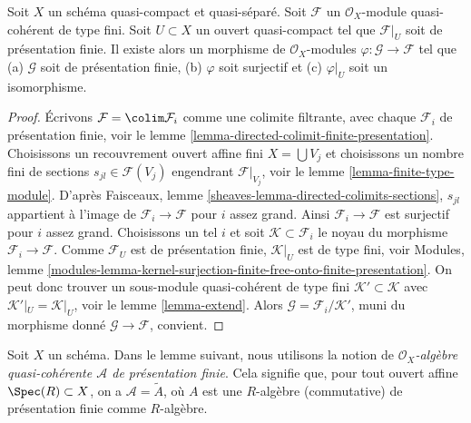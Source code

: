 \begin{lemma}
\label{lemma-application-directed-colimit}
Soit $X$ un schéma quasi-compact et quasi-séparé.
Soit $\mathcal{F}$ un $\mathcal{O}_X$-module quasi-cohérent de type fini.
Soit $U \subset X$ un ouvert quasi-compact tel que $\mathcal{F}|_U$
soit de présentation finie. Il existe alors un morphisme de $\mathcal{O}_X$-modules
$\varphi : \mathcal{G} \to \mathcal{F}$ tel que
(a) $\mathcal{G}$ soit de présentation finie,
(b) $\varphi$ soit surjectif et
(c) $\varphi|_U$ soit un isomorphisme.
\end{lemma}

\begin{proof}
Écrivons $\mathcal{F} = \colim \mathcal{F}_i$ comme une colimite filtrante,
avec chaque $\mathcal{F}_i$ de présentation finie,
voir le lemme \ref{lemma-directed-colimit-finite-presentation}.
Choisissons un recouvrement ouvert affine fini $X = \bigcup V_j$ et choisissons
un nombre fini de sections $s_{jl} \in \mathcal{F}(V_j)$ engendrant
$\mathcal{F}|_{V_j}$, voir le lemme \ref{lemma-finite-type-module}.
D'après Faisceaux, lemme \ref{sheaves-lemma-directed-colimits-sections},
$s_{jl}$ appartient à l'image de $\mathcal{F}_i \to \mathcal{F}$
pour $i$ assez grand. Ainsi $\mathcal{F}_i \to \mathcal{F}$ est surjectif
pour $i$ assez grand. Choisissons un tel $i$ et soit
$\mathcal{K} \subset \mathcal{F}_i$ le noyau du morphisme
$\mathcal{F}_i \to \mathcal{F}$. Comme $\mathcal{F}_U$ est de présentation
finie, $\mathcal{K}|_U$ est de type fini, voir
Modules, lemme
\ref{modules-lemma-kernel-surjection-finite-free-onto-finite-presentation}.
On peut donc trouver un sous-module quasi-cohérent de type fini
$\mathcal{K}' \subset \mathcal{K}$ avec $\mathcal{K}'|_U = \mathcal{K}|_U$,
voir le lemme \ref{lemma-extend}. Alors
$\mathcal{G} = \mathcal{F}_i/\mathcal{K}'$,
muni du morphisme donné $\mathcal{G} \to \mathcal{F}$, convient.
\end{proof}

\noindent
Soit $X$ un schéma. Dans le lemme suivant, nous utilisons la notion
de {\it $\mathcal{O}_X$-algèbre quasi-cohérente $\mathcal{A}$
de présentation finie}. Cela signifie que, pour tout ouvert affine
$\Spec(R) \subset X$, on a $\mathcal{A} = \widetilde{A}$,
où $A$ est une $R$-algèbre (commutative) de présentation finie
comme $R$-algèbre.

